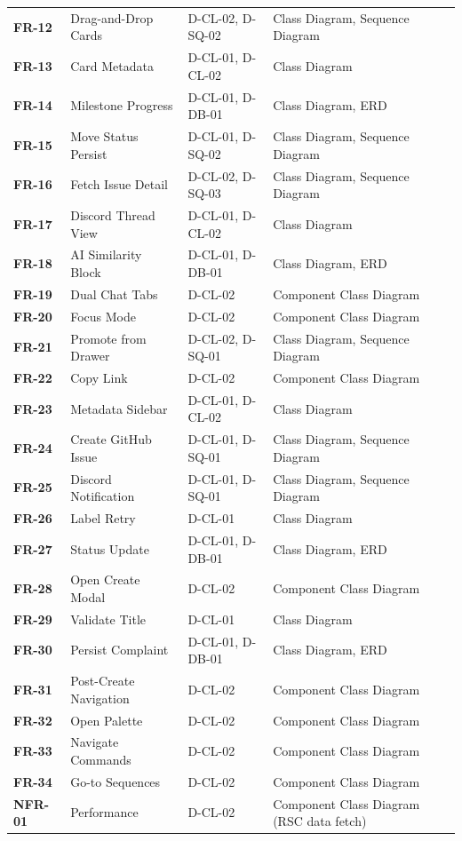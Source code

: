 \documentclass[12pt,a4paper]{report}
\begin{document}
\begin{longtable}{>{\bfseries}p{2.2cm} p{4.5cm} p{3.5cm} p{3.5cm}}
FR-12 & Drag-and-Drop Cards & D-CL-02, D-SQ-02 & Class Diagram, Sequence Diagram \\
FR-13 & Card Metadata & D-CL-01, D-CL-02 & Class Diagram \\
FR-14 & Milestone Progress & D-CL-01, D-DB-01 & Class Diagram, ERD \\
FR-15 & Move Status Persist & D-CL-01, D-SQ-02 & Class Diagram, Sequence Diagram \\
FR-16 & Fetch Issue Detail & D-CL-02, D-SQ-03 & Class Diagram, Sequence Diagram \\
FR-17 & Discord Thread View & D-CL-01, D-CL-02 & Class Diagram \\
FR-18 & AI Similarity Block & D-CL-01, D-DB-01 & Class Diagram, ERD \\
FR-19 & Dual Chat Tabs & D-CL-02 & Component Class Diagram \\
FR-20 & Focus Mode & D-CL-02 & Component Class Diagram \\
FR-21 & Promote from Drawer & D-CL-02, D-SQ-01 & Class Diagram, Sequence Diagram \\
FR-22 & Copy Link & D-CL-02 & Component Class Diagram \\
FR-23 & Metadata Sidebar & D-CL-01, D-CL-02 & Class Diagram \\
FR-24 & Create GitHub Issue & D-CL-01, D-SQ-01 & Class Diagram, Sequence Diagram \\
FR-25 & Discord Notification & D-CL-01, D-SQ-01 & Class Diagram, Sequence Diagram \\
FR-26 & Label Retry & D-CL-01 & Class Diagram \\
FR-27 & Status Update & D-CL-01, D-DB-01 & Class Diagram, ERD \\
FR-28 & Open Create Modal & D-CL-02 & Component Class Diagram \\
FR-29 & Validate Title & D-CL-01 & Class Diagram \\
FR-30 & Persist Complaint & D-CL-01, D-DB-01 & Class Diagram, ERD \\
FR-31 & Post-Create Navigation & D-CL-02 & Component Class Diagram \\
FR-32 & Open Palette & D-CL-02 & Component Class Diagram \\
FR-33 & Navigate Commands & D-CL-02 & Component Class Diagram \\
FR-34 & Go-to Sequences & D-CL-02 & Component Class Diagram \\
NFR-01 & Performance & D-CL-02 & Component Class Diagram (RSC data fetch) \\

\end{longtable}
\end{document}
